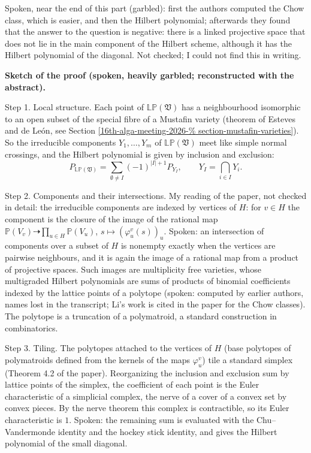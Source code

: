 Spoken, near the end of this part (garbled):
first the authors computed the Chow class,
which is easier, and then the Hilbert
polynomial; afterwards they found that the
answer to the question is negative: there is
a linked projective space that does not lie
in the main component of the Hilbert scheme,
although it has the Hilbert polynomial of the
diagonal. Not checked; I could not find this
in writing.

\medskip\noindent
{\bf Sketch of the proof (spoken, heavily
garbled; reconstructed with the abstract).}

Step 1. Local structure. Each point of
$\mathbb{LP}(\mathfrak{V})$ has a
neighbourhood isomorphic to an open subset of
the special fibre of a Mustafin variety
(theorem of Esteves and de Le\'on, see
Section
\ref{16th-alga-meeting-2026-%
section-mustafin-varieties}).
So the irreducible components $Y_1,\dots,Y_m$
of $\mathbb{LP}(\mathfrak{V})$ meet like
simple normal crossings, and the Hilbert
polynomial is given by inclusion and
exclusion:
$$
P_{\mathbb{LP}(\mathfrak{V})}
=\sum_{\emptyset\neq I}(-1)^{|I|+1}P_{Y_I},
\qquad Y_I=\bigcap_{i\in I}Y_i .
$$

Step 2. Components and their intersections.
My reading of the paper, not checked in
detail: the irreducible components are
indexed by vertices of $H$: for $v\in H$ the
component is the closure of the image of the
rational map
$\mathbb{P}(V_v)\dashrightarrow\prod_{u\in
H}\mathbb{P}(V_u)$,
$s\mapsto(\varphi^v_u(s))_u$. Spoken: an
intersection of components over a subset of
$H$ is nonempty exactly when the vertices are
pairwise neighbours, and it is again the
image of a rational map from a product of
projective spaces. Such images are
multiplicity free varieties, whose
multigraded Hilbert polynomials are sums of
products of binomial coefficients indexed by
the lattice points of a polytope (spoken:
computed by earlier authors, names lost in
the transcript; Li's work is cited in the
paper for the Chow classes). The polytope is
a truncation of a polymatroid, a standard
construction in combinatorics.

Step 3. Tiling. The polytopes attached to the
vertices of $H$ (base polytopes of
polymatroids defined from the kernels of the
maps $\varphi^v_u$) tile a standard simplex
(Theorem 4.2 of the paper). Reorganizing the
inclusion and exclusion sum by lattice points
of the simplex, the coefficient of each point
is the Euler characteristic of a simplicial
complex, the nerve of a cover of a convex set
by convex pieces. By the nerve theorem this
complex is contractible, so its Euler
characteristic is $1$. Spoken: the remaining
sum is evaluated with the Chu--Vandermonde
identity and the hockey stick identity, and
gives the Hilbert polynomial of the small
diagonal.

